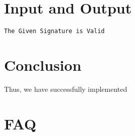 \documentclass[11pt]{article}
\begin{document}
\section{Input and Output}

\begin{verbatim}
The Given Signature is Valid
\end{verbatim}


% 

\section{Conclusion}
Thus, we have successfully implemented 
\clearpage

\section{FAQ}
\end{document}
